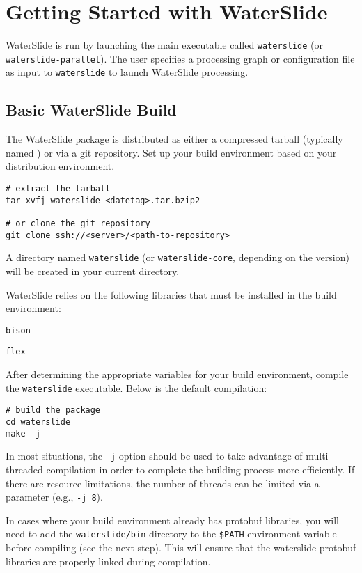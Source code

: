 \documentclass[11pt]{article}
\begin{document}
\section {Getting Started with WaterSlide}

WaterSlide is run by launching the main executable called \texttt{waterslide} (or
\texttt{waterslide-parallel}).  The user specifies a
processing graph or configuration file as input to \texttt{waterslide} to launch WaterSlide processing.

\subsection {Basic WaterSlide Build}
The WaterSlide package is distributed as either a compressed tarball (typically
named ) or via a git repository. Set up your build
environment based on your distribution environment.

\begin{lstlisting}
# extract the tarball
tar xvfj waterslide_<datetag>.tar.bzip2

# or clone the git repository
git clone ssh://<server>/<path-to-repository>
\end{lstlisting}
\nopagebreak
A directory named \texttt{waterslide} (or \texttt{waterslide-core}, depending on the version) will be
created in your current directory.

WaterSlide relies on the following libraries that must be installed in the build
environment:
\begin{itemize*}
\item \texttt{bison}
\item \texttt{flex}
\end{itemize*}

After determining the appropriate variables for your build environment, compile the
\texttt{waterslide} executable. Below is the default compilation:
\begin{lstlisting}
# build the package
cd waterslide
make -j
\end{lstlisting}
\nopagebreak
{\note In most situations, the \texttt{-j} option should be used to take advantage of
multi-threaded compilation in order to complete the building process more efficiently. If there are
resource limitations, the number of threads can be limited via a parameter (e.g., \texttt{-j
8}).}

{\note  In cases where your build environment already has protobuf libraries, you
will need to add the \texttt{waterslide/bin} directory to the \texttt{\$PATH} environment variable before compiling (see
the next step). This will ensure that the waterslide protobuf libraries are properly
linked during compilation.}
\end{document}
